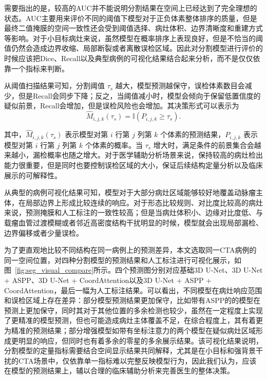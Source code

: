 

需要指出的是，较高的AUC并不能说明分割结果在空间上已经达到了完全理想的状态。AUC主要用来评价不同的阈值下模型对于正负体素整体排序的质量，但是最终二值掩膜的空间一致性还会受到阈值选择、病灶体积、边界清晰度和重建方式等影响。对于小目标病灶来说，虽然模型在概率排序上表现良好，但是不恰当的阈值仍然会造成边界收缩、局部断裂或者离散误检区域。因此对分割模型进行评价的时候应该把Dice、Recall以及典型病例的可视化结果结合起来分析，而不是仅仅依靠一个指标来判断。

从阈值扫描结果可知，分割阈值 $\tau_s$ 越大，模型预测越保守，误检体素数目会减少，但是Recall会同步下降；反之，当阈值减小时，模型会倾向于保留低置信度的疑似前景，Recall会增加，但是误检风险也会增加。其决策形式可以表示为
\begin{equation}
\hat{M}_{i,j,k}(\tau_s)=\mathbb{I}\left(P_{i,j,k}\geq \tau_s\right).
\label{eq:threshold-decision}
\end{equation}

其中，$\hat{M}_{i,j,k}(\tau_s)$ 表示模型对第 $i$ 行第 $j$ 列第 $k$ 个体素的预测结果，$P_{i,j,k}$ 表示模型对第 $i$ 行第 $j$ 列第 $k$ 个体素的概率。当 $\tau_s$ 增大时，满足条件的前景集合会越来越小，漏检概率也随之增大。对于医学辅助分析场景来说，保持较高的病灶检出能力很重要，但是同时也要控制误检区域的大小，保证后续结构定量分析以及临床展示的可解释性。

从典型的病例可视化结果可知，模型对于大部分病灶区域能够较好地覆盖动脉瘤主体，在局部边界上形成比较连续的响应。对于形态比较规则、对比度比较高的病灶来说，预测掩膜和人工标注的一致性较高；但是当病灶体积小、边缘对比度低、与载瘤血管过渡模糊或者邻近高密度结构干扰明显的时候，模型就会出现局部漏检、边界偏移或者少量误检。

为了更直观地比较不同结构在同一病例上的预测差异，本文选取同一CTA病例的同一空间位置，对四种分割模型的预测结果和人工标注进行可视化展示，如图~\ref{fig:seg_visual_compare}所示。四个预测图分别对应基础3D U-Net、3D U-Net + ASPP、3D U-Net + CoordAttention以及3D U-Net + ASPP + CoordAttention，最后一幅为人工标注结果。可以看出，不同模型在病灶响应范围和误检区域上存在差异：部分模型预测结果更加保守，比如带有ASPP的的模型在预测上更加保守，同时其对于其他位置的多余检测也较少，虽然在一定程度上实现了更精准的模型预测，但也可能造成病灶主体覆盖不足，在综合程度上，其有着更为精准的预测结果；部分增强模型如带有坐标注意力的两个模型在疑似病灶区域形成更明显的响应，但同时也有着多余的零星的多余展示结果。该可视化结果说明，分割模型的定量指标需要结合空间显示结果共同解释，尤其是在小目标和强背景干扰的CTA场景中，仅依靠单一指标难以完整反映模型行为，因此我们认为，应该在模型的预测结果上，辅以合理的临床辅助分析来完善医生的整体决策。

